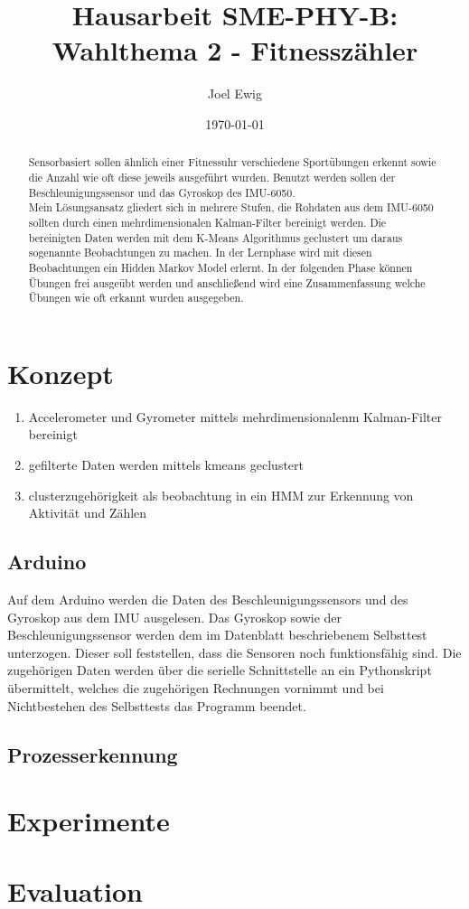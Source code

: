 \documentclass{article}
\begin{document}
\title{Hausarbeit SME-PHY-B: Wahlthema 2 - Fitnesszähler}
\author{Joel Ewig}
\date{\today}
\maketitle
\clearpage

\begin{abstract}
Sensorbasiert sollen ähnlich einer Fitnessuhr verschiedene Sportübungen erkennt sowie die Anzahl wie oft diese jeweils ausgeführt wurden.
Benutzt werden sollen der Beschleunigungssensor und das Gyroskop des IMU-6050.\\
Mein L\"osungsansatz gliedert sich in mehrere Stufen, die Rohdaten aus dem IMU-6050 sollten durch einen mehrdimensionalen Kalman-Filter bereinigt werden.
Die bereinigten Daten werden mit dem K-Means Algorithmus geclustert um daraus sogenannte \glqq{}Beobachtungen\grqq{} zu machen.
In der Lernphase wird mit diesen Beobachtungen ein Hidden Markov Model erlernt.
In der folgenden Phase k\"onnen \"Ubungen frei ausge\"ubt werden und anschließend wird eine Zusammenfassung welche \"Ubungen wie oft erkannt wurden ausgegeben.
\end{abstract}
\clearpage

\tableofcontents
\clearpage


\section{Konzept}
\begin{enumerate}
\item Accelerometer und Gyrometer mittels mehrdimensionalenm Kalman-Filter bereinigt
\item gefilterte Daten werden mittels kmeans geclustert
\item clusterzugeh\"origkeit als beobachtung in ein HMM zur Erkennung von Aktivit\"at und Z\"ahlen
\end{enumerate}
\subsection{Arduino}
Auf dem Arduino werden die Daten des Beschleunigungssensors und des Gyroskop aus dem IMU ausgelesen.
Das Gyroskop sowie der Beschleunigungssensor werden dem im Datenblatt beschriebenem Selbsttest unterzogen.
Dieser soll feststellen, dass die Sensoren noch funktionsf\"ahig sind.
Die zugeh\"origen Daten werden \"uber die serielle Schnittstelle an ein Pythonskript \"ubermittelt, welches die zugeh\"origen Rechnungen vornimmt und bei Nichtbestehen des Selbsttests das Programm beendet.\\

\subsection{Prozesserkennung}

\section{Experimente}
\section{Evaluation}
\end{document}
